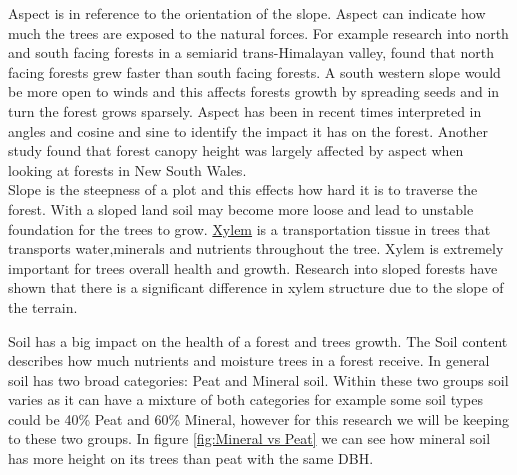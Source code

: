 \documentclass[a4paper,11pt,twoside]{report}
\begin{document}
\newpage
Aspect is in reference to the orientation of the slope. Aspect can indicate how much the trees are exposed to the natural forces. For example research into north and south facing forests in a semiarid trans-Himalayan valley, found that north facing forests grew faster than south facing forests. \cite{Aspect/on/tree/growth}
A south western slope would be more open to winds and this affects forests growth by spreading seeds and in turn the forest grows sparsely. Aspect has been in recent times interpreted in angles and cosine and sine to identify the impact it has on the forest. Another study found that forest canopy height was largely affected by aspect when looking at forests in New South Wales.\cite{aspectforestcanopy}\\ %
Slope is the steepness of a plot and this effects how hard it is to traverse the forest. With a sloped land soil may become more loose and lead to unstable foundation for the trees to grow. \href{https://pdfs.semanticscholar.org/6e74/b49c6c3f6c37ed93575f7f9e48878d30b391.pdf}{Xylem} is a transportation tissue in trees that transports water,minerals and nutrients throughout the tree. Xylem is extremely important for trees overall health and growth. Research into sloped forests have shown that there is a significant difference in xylem structure due to the slope of the terrain.\cite{xylemslope}



Soil has a big impact on the health of a forest and trees growth. The Soil content describes how much nutrients and moisture trees in a forest receive. In general soil has two broad categories: Peat and Mineral soil. Within these two groups soil varies as it can have a mixture of both categories for example some soil types could be 40\% Peat and 60\% Mineral, however for this research we will be keeping to these two groups. In figure \ref{fig:Mineral vs Peat} we can see how mineral soil has more height on its trees than peat with the same DBH.


\end{document}
